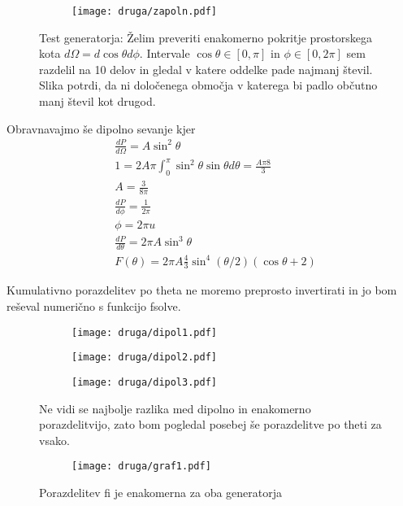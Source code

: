 \documentclass{article}
\begin{document}
\begin{figure}[H]
\centering
\begin{subfigure}{.7\textwidth}
\texttt{[image: druga/zapoln.pdf]}
\end{subfigure}
\caption*{Test generatorja: Želim preveriti enakomerno pokritje prostorskega kota $d\Omega = d\cos\theta d\phi$. Intervale $\cos\theta \in [0,\pi]$ in $\phi \in [0,2\pi]$ sem razdelil na 10 delov in gledal v katere oddelke pade najmanj števil. Slika potrdi, da ni določenega območja v katerega bi padlo občutno manj števil kot drugod.}
\end{figure}

Obravnavajmo še dipolno sevanje kjer 
\begin{align*}
&\frac{dP}{d\Omega} = A \sin^2 \theta \\
&1 = 2A\pi \int_0^\pi \sin^2\theta \sin\theta d\theta = \frac{A\pi 8}{3} \\
&A = \frac{3}{8\pi} \\
&\frac{dP}{d\phi} = \frac{1}{2\pi} \\
&\phi = 2\pi u \\
&\frac{dP}{d\theta} = 2\pi A \sin^3 \theta \\
&F(\theta) = 2\pi A \frac{4}{3} \sin^4(\theta/2)(\cos\theta + 2) 
\end{align*}

Kumulativno porazdelitev po theta ne moremo preprosto invertirati in jo bom reševal numerično s funkcijo fsolve.

\begin{figure}[H]
\centering
\begin{subfigure}{.32\textwidth}
\texttt{[image: druga/dipol1.pdf]}
\end{subfigure}
\begin{subfigure}{.32\textwidth}
\texttt{[image: druga/dipol2.pdf]}
\end{subfigure}
\begin{subfigure}{.32\textwidth}
\texttt{[image: druga/dipol3.pdf]}
\end{subfigure}
\caption*{Ne vidi se najbolje razlika med dipolno in enakomerno porazdelitvijo, zato bom pogledal posebej še porazdelitve po theti za vsako.}
\end{figure}

\begin{figure}[H]
\centering
\begin{subfigure}{.7\textwidth}
\texttt{[image: druga/graf1.pdf]}
\end{subfigure}
\caption*{Porazdelitev fi je enakomerna za oba generatorja}
\end{figure}
\end{document}
